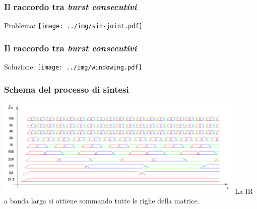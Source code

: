 \documentclass[10pt]{beamer}
\begin{document}
\begin{frame}
    \frametitle{Il raccordo tra \em burst \em consecutivi}

    \begin{center}    
      \begin{block}{Problema:}
	\centering
	\texttt{[image: ../img/sin-joint.pdf]}
      \end{block}
    \end{center}
\end{frame}

\begin{frame}
    \frametitle{Il raccordo tra \em burst \em consecutivi}

    \begin{center}    
      \begin{block}{Soluzione:}
	\centering
	\texttt{[image: ../img/windowing.pdf]}
      \end{block}
    \end{center}
\end{frame}

\begin{frame}
  \frametitle{Schema del processo di sintesi}

  \begin{center}    
    \includegraphics[width = 12cm]{graph/chunks_slides.pdf}
    \vskip 0.3cm
    La IR a banda larga si ottiene sommando tutte le righe della matrice.

  \end{center}
\end{frame}  
\end{document}
